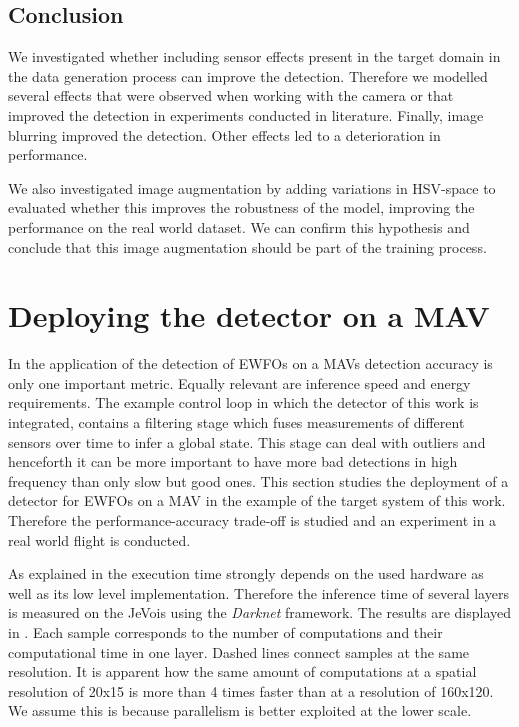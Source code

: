 \subsection{Conclusion}

We investigated whether including sensor effects present in the target domain in the data generation process can improve the detection. Therefore we modelled several effects that were observed when working with the camera or that improved the detection in experiments conducted in literature. Finally, image blurring improved the detection. Other effects led to a deterioration in performance.

We also investigated image augmentation by adding variations in HSV-space to evaluated whether this improves the robustness of the model, improving the performance on the real world dataset. We can confirm this hypothesis and conclude that this image augmentation should be part of the training process.

\section{Deploying the detector on a \ac{MAV}}

In the application of the detection of \acp{EWFO} on a \acp{MAV} detection accuracy is only one important metric. Equally relevant are inference speed and energy requirements. The example control loop in which the detector of this work is integrated, contains a filtering stage which fuses measurements of different sensors over time to infer a global state. This stage can deal with outliers and henceforth it can be more important to have more bad detections in high frequency than only slow but good ones. This section studies the deployment of a detector for \acp{EWFO} on a \ac{MAV} in the example of the target system of this work. Therefore the performance-accuracy trade-off is studied and an experiment in a real world flight is conducted.

As explained in  the execution time strongly depends on the used hardware as well as its low level implementation. Therefore the inference time of several layers is measured on the JeVois using the \textit{Darknet} framework. The results are displayed in . Each sample corresponds to the number of computations and their computational time in one layer. Dashed lines connect samples at the same resolution. It is apparent how the same amount of computations at a spatial resolution of 20x15 is more than 4 times faster than at a resolution of 160x120. We assume this is because parallelism is better exploited at the lower scale.

